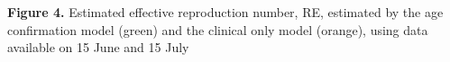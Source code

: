 \textbf{Figure 4.} Estimated effective reproduction number, RE,
estimated by the age confirmation model (green) and the clinical only
model (orange), using data available on 15 June and 15 July